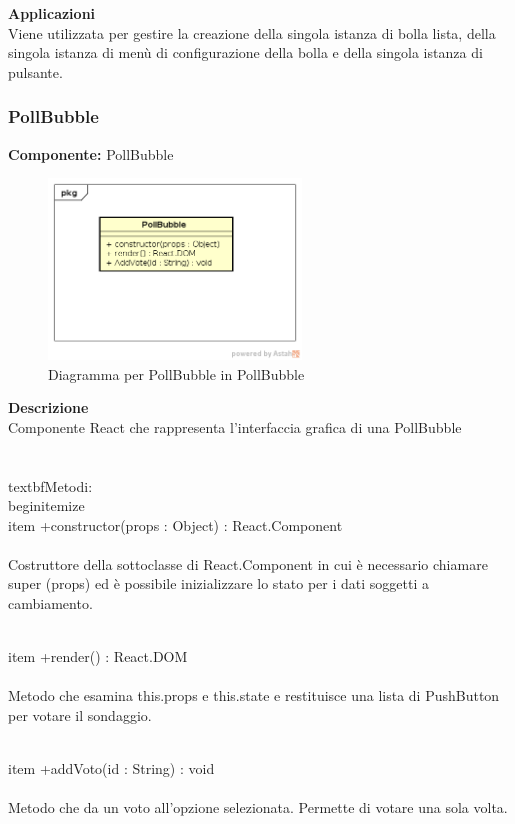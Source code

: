 \textbf{Applicazioni}\\
Viene utilizzata per gestire la creazione della singola istanza di bolla lista, della singola istanza di menù di configurazione della bolla e della singola istanza di pulsante. 


\clearpage

\subsubsection{PollBubble}
\textbf{Componente:}  PollBubble\\
   \FloatBarrier
   \begin{figure}[ht]
   \centering
   \includegraphics[width=0.6\textwidth]{img/single-PollBubble}
   \caption{{Diagramma per PollBubble in PollBubble}}
\end{figure}
\FloatBarrier
\textbf{Descrizione}\\
Componente React che rappresenta l'interfaccia grafica di una PollBubble
\\\\
\\textbf{Metodi:} 
\\begin{itemize}
\\item +constructor(props : Object) : React.Component 
\\\\
Costruttore della sottoclasse di React.Component in cui è necessario chiamare super (props) ed è possibile inizializzare lo stato per i dati soggetti a cambiamento.

\\item +render() : React.DOM 
\\\\
Metodo che esamina this.props e this.state e restituisce una lista di PushButton per votare il sondaggio. 

\\item +addVoto(id : String) : void \\\\
Metodo che da un voto all'opzione selezionata. Permette di votare una sola volta.

